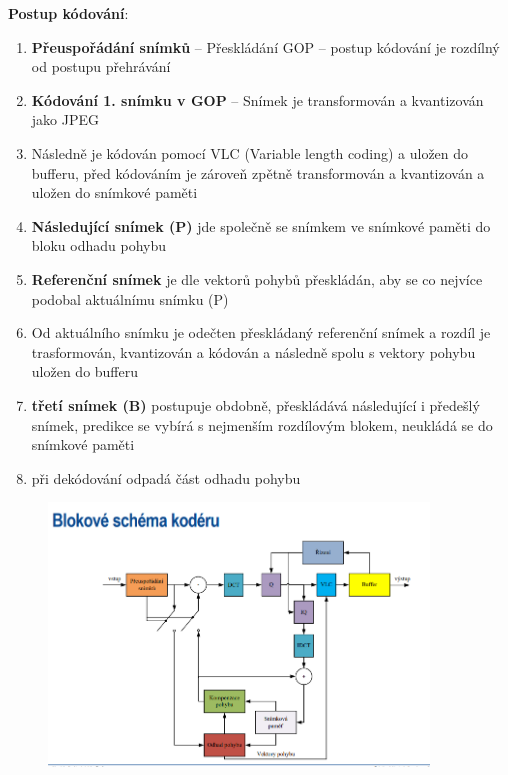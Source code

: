 \textbf{Postup kódování}:
\begin{enumerate}
    \item \textbf{Přeuspořádání snímků} -- Přeskládání GOP – postup kódování je rozdílný od postupu přehrávání
    \item \textbf{Kódování 1. snímku v GOP} -- Snímek je transformován a kvantizován jako JPEG
\item Následně je kódován pomocí VLC (Variable length coding) a uložen do bufferu, před kódováním je zároveň zpětně
transformován a kvantizován a uložen do snímkové paměti
\item \textbf{Následující snímek (P)} jde společně se snímkem ve snímkové paměti do bloku odhadu pohybu
\item \textbf{Referenční snímek} je dle vektorů pohybů přeskládán, aby se co nejvíce podobal aktuálnímu snímku (P)
\item Od aktuálního snímku je odečten přeskládaný referenční snímek a rozdíl je trasformován, kvantizován a kódován a
následně spolu s vektory pohybu uložen do bufferu
\item \textbf{třetí snímek (B)} postupuje obdobně, přeskládává následující i předešlý snímek, predikce se vybírá s nejmenším rozdílovým blokem, neukládá se do snímkové paměti
\item při dekódování odpadá část odhadu pohybu
\end{enumerate}

\begin{figure} [h]
     \centering
     \includegraphics[width=0.9\textwidth]{images/kodovanie-mpeg.PNG}
\end{figure}

